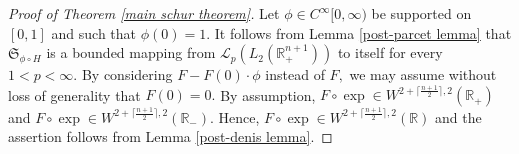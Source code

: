 \documentclass[12pt]{amsart}
\begin{document}
\begin{proof}[Proof of Theorem \ref{main schur theorem}] Let $\phi\in C^{\infty}[0,\infty)$ be supported on $[0,1]$ and such that $\phi(0)=1.$ It follows from Lemma \ref{post-parcet lemma} that $\mathfrak{S}_{\phi\circ H}$ is a bounded mapping from $\mathcal{L}_p(L_2(\mathbb{R}^{n+1}_+))$ to itself for every $1<p<\infty.$ By considering $F-F(0)\cdot\phi$ instead of $F,$ we may assume without loss of generality that $F(0)=0.$ By assumption, $F\circ\exp\in W^{2+\lceil\frac{n+1}{2}\rceil,2}(\mathbb{R}_+)$ and $F\circ\exp\in W^{2+\lceil\frac{n+1}{2}\rceil,2}(\mathbb{R}_-).$ Hence, $F\circ\exp\in W^{2+\lceil\frac{n+1}{2}\rceil,2}(\mathbb{R})$ and the assertion follows from Lemma \ref{post-denis lemma}.
\end{proof}
\end{document}
